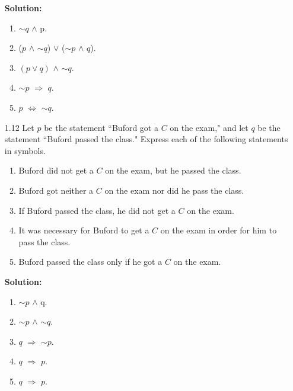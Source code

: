 \begin{enumerate}
      \textbf{Solution:}

      \begin{enumerate}
         \item $\sim$$q$ $\land$ p.
         \item ($p$ $\land$ $\sim$$q$) $\lor$ ($\sim$$p$ $\land$ $q$).
         \item $(p \lor q)$ $\land$ $\sim$$q$.
         \item $\sim$$p$ $\Rightarrow$ $q$.
         \item $p$ $\Leftrightarrow$ $\sim$$q$.
      \end{enumerate}

   \item[1.12] Let $p$ be the statement ``Buford got a $C$ on the exam," and
               let $q$ be the statement ``Buford passed the class." Express
               each of the following statements in symbols.
      \begin{enumerate}
         \item Buford did not get a $C$ on the exam, but he passed the class.
         \item Buford got neither a $C$ on the exam nor did he pass the class.
         \item If Buford passed the class, he did not get a $C$ on the exam.
         \item It was necessary for Buford to get a $C$ on the exam in order for
               him to pass the class.
         \item Buford passed the class only if he got a $C$ on the exam.
      \end{enumerate}

      \textbf{Solution:}

      \begin{enumerate}
         \item $\sim$$p$ $\land$ q.
         \item $\sim$$p$ $\land$ $\sim$$q$.
         \item $q$ $\Rightarrow$ $\sim$$p$.
         \item $q$ $\Rightarrow$ $p$.
         \item $q$ $\Rightarrow$ $p$.
      \end{enumerate}


\end{enumerate}
